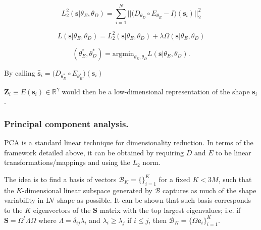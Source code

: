 \documentclass[twocolumn]{llncs}
\begin{document}
\begin{equation}
L_2^2(\textbf{s}|\theta_E, \theta_D)=
\sum_{i=1}^{N} \big|\big|\big(D_{\theta_D} \circ E_{\theta_E} - I\big) (\textbf{s}_i) \big|\big|_2^2
\end{equation}

\begin{equation}
L(\textbf{s}|\theta_E, \theta_D)= L_2^2(\textbf{s}|\theta_E, \theta_D) + \lambda\Omega(\textbf{s}|\theta_E, \theta_D)
\end{equation}

\begin{equation}
(\theta_E^*, \theta_D^*) = \text{argmin}_{\theta_E, \theta_D}L(\textbf{s}|\theta_E, \theta_D).    
\end{equation}{}


By calling $\hat{\textbf{s}}_i=\big(D_{\theta_D^*} \circ E_{\theta_E^*}\big)(\textbf{s}_i)$

$\textbf{Z}_i\equiv E(\textbf{s}_i)\in\mathbb{R}^{\gamma}$ would then be a low-dimensional representation of the shape $\textbf{s}_i$.

\subsubsection{Principal component analysis.}
PCA is a standard linear technique for dimensionality reduction. In terms of the framework detailed above, it can be obtained by requiring $D$ and $E$ to be linear transformations/mappings and using the $L_2$ norm.

The idea is to find a basis of vectors $\mathcal{B}_{K}=\{\}_{i=1}^{K}$ for a fixed $K < 3M$, such that the $K$-dimensional linear subspace generated by $\mathcal{B}$ captures as much of the shape variability in LV shape as possible. It can be shown that such basis corresponds to the $K$ eigenvectors of the $\textbf{S}$ matrix with the top largest eigenvalues; i.e. if $\textbf{S}=\Omega^{t}\Lambda\Omega$ where $\Lambda=\delta_{ij}\lambda_i$ and $\lambda_i \geq \lambda_j$ if $i\leq j$, then $\mathcal{B}_{K}=\{{\Omega\textbf{e}_i}\}_{i=1}^{K}$.

\end{document}

